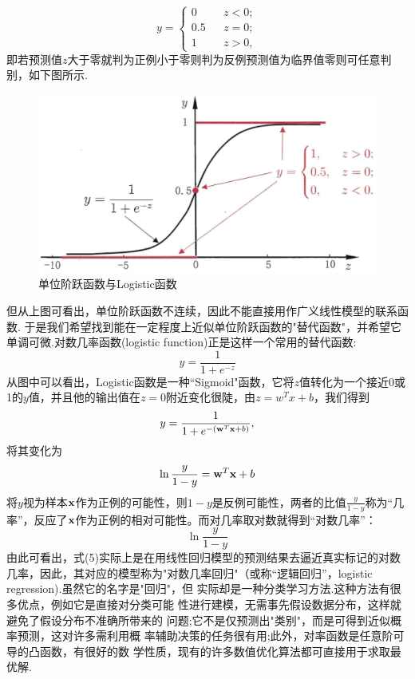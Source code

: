 \documentclass[a4paper]{article}
\begin{document}
\begin{equation} y=\left\{
\begin{array}{rcl}
0       &      & {z<0;}\\
0.5     &      & {z=0;}\\
1     &      & {z>0,}
\end{array} \right. 
\end{equation}
即若预测值$z$大于零就判为正例小于零则判为反例预测值为临界值零则可任意判别，如下图所示.
\begin{figure}[H]
	\centering
	\includegraphics[width=0.7\linewidth]{Lr}
	\caption{单位阶跃函数与Logistic函数}
	\label{fig:lr}
\end{figure}
但从上图可看出，单位阶跃函数不连续，因此不能直接用作广义线性模型的联系函数. 于是我们希望找到能在一定程度上近似单位阶跃函数的"替代函数"，并希望它单调可微.对数几率函数(logistic function)正是这样一个常用的替代函数:\\
\begin{equation}
y = \frac{1}{1 + e ^ {-z}}
\end{equation}
从图中可以看出，Logistic函数是一种“Sigmoid"函数，它将$z$值转化为一个接近0或1的$y$值，并且他的输出值在$z=0$附近变化很陡，由$z=w^{T}x+b$，我们得到\\
\begin{equation}y = \frac{1}{1 + e ^ {-({\bf w}^T{\bf x}+ b)}},\end{equation}
将其变化为\\
\begin{equation}
\ln \frac{y}{1-y}={\bf w}^T{\bf x}+ b
\end{equation}
将$y$视为样本${\bf x}$作为正例的可能性，则$1-y$是反例可能性，两者的比值$\frac{y}{1-y}$称为“几率”，反应了${\bf x}$作为正例的相对可能性。而对几率取对数就得到“对数几率”：
\begin{equation}
 \ln \frac{y}{1-y}
\end{equation}
由此可看出，式(5)实际上是在用线性回归模型的预测结果去逼近真实标记的对数几率，因此，其对应的模型称为"对数几率回归"（或称“逻辑回归”，logistic regression).虽然它的名字是"回归"，但 实际却是一种分类学习方法.这种方法有很多优点，例如它是直接对分类可能 性进行建模，无需事先假设数据分布，这样就避免了假设分布不准确所带来的 问题;它不是仅预测出"类别"，而是可得到近似概率预测，这对许多需利用概 率辅助决策的任务很有用;此外，对率函数是任意阶可导的凸函数，有很好的数 学性质，现有的许多数值优化算法都可直接用于求取最优解.
\end{document}
